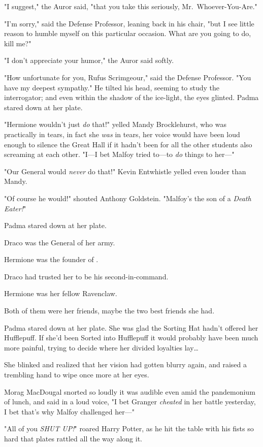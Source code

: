 "I suggest," the Auror said, "that you take this seriously, 
Mr.~Whoever-You-Are."

"I'm sorry," said the Defense Professor, leaning back in his chair, "but I see 
little reason to humble myself on this particular occasion. What are you going 
to do, kill me?"

"I don't appreciate your humor," the Auror said softly.

"How unfortunate for you, Rufus Scrimgeour," said the Defense Professor. "You 
have my deepest sympathy." He tilted his head, seeming to study the 
interrogator; and even within the shadow of the ice-light, the eyes glinted.
\sbreak
Padma stared down at her plate.

"Hermione wouldn't just \emph{do} that!" yelled Mandy Brocklehurst, who was 
practically in tears, in fact she \emph{was} in tears, her voice would have 
been loud enough to silence the Great Hall if it hadn't been for all the other 
students also screaming at each other. "I---I bet Malfoy tried to---to 
\emph{do} things to her---"

"Our General would \emph{never} do that!" Kevin Entwhistle yelled even louder 
than Mandy.

"Of course he would!" shouted Anthony Goldstein. "Malfoy's the son of a 
\emph{Death Eater!}"

Padma stared down at her plate.

Draco was the General of her army.

Hermione was the founder of \SPHEW.

Draco had trusted her to be his second-in-command.

Hermione was her fellow Ravenclaw.

Both of them were her friends, maybe the two best friends she had.

Padma stared down at her plate. She was glad the Sorting Hat hadn't offered her 
Hufflepuff. If she'd been Sorted into Hufflepuff it would probably have been 
much more painful, trying to decide where her divided loyalties lay{\ldots}

She blinked and realized that her vision had gotten blurry again, and raised a 
trembling hand to wipe once more at her eyes.

Morag MacDougal snorted so loudly it was audible even amid the pandemonium of 
lunch, and said in a loud voice, "I bet Granger \emph{cheated} in her battle 
yesterday, I bet that's why Malfoy challenged her---"

"All of you \emph{SHUT UP!}" roared Harry Potter, as he hit the table with his 
fists so hard that plates rattled all the way along it.

